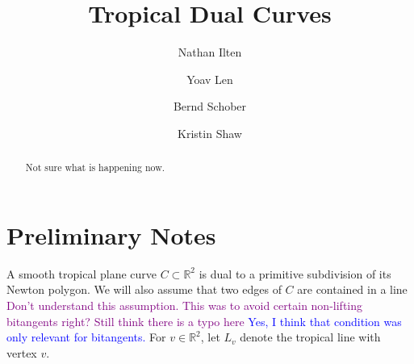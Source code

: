 \documentclass[oneside]{amsart}
\title{Tropical Dual Curves}
\author{Nathan Ilten}
\author{Yoav Len}
\author{Bernd Schober}
\author{Kristin Shaw}
\newcommand{\RR}{\mathbb{R}}
\theoremstyle{definition}
\newcommand{\yoav}[1]{\textcolor{blue}{#1}}
\newcommand{\kristin}[1]{\textcolor{purple}{#1}}
\begin{document}
\begin{abstract}
Not sure what is happening now. 
\end{abstract}
\maketitle
\section{Preliminary Notes}
A smooth tropical plane curve $C\subset \mathbb{R}^2$ is dual to a primitive
subdivision of its Newton polygon. We will also assume that  two edges  of $C$
are contained in a line  \kristin{Don't understand this assumption. This was to
avoid certain non-lifting bitangents right?
Still think there is a typo here} \yoav{Yes, I think that condition was only relevant for bitangents.} For $v\in\RR^2$, let
$L_v$ denote the tropical line with vertex $v$.
\end{document}
